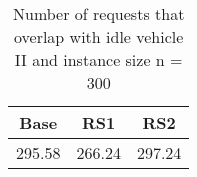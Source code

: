 \begin{table}[H]
\centering
\begin{tabular}{ccc}
  \hline
  \textbf{Base} & \textbf{RS1} & \textbf{RS2} \\\hline
  295.58 & 266.24 & 297.24 \\\hline
\end{tabular}
\caption{Number of requests that overlap with idle vehicle II and instance size n = 300}
\label{tab:wait:resrelocation-number-request-overlap-comparison_II_300}
\end{table}
